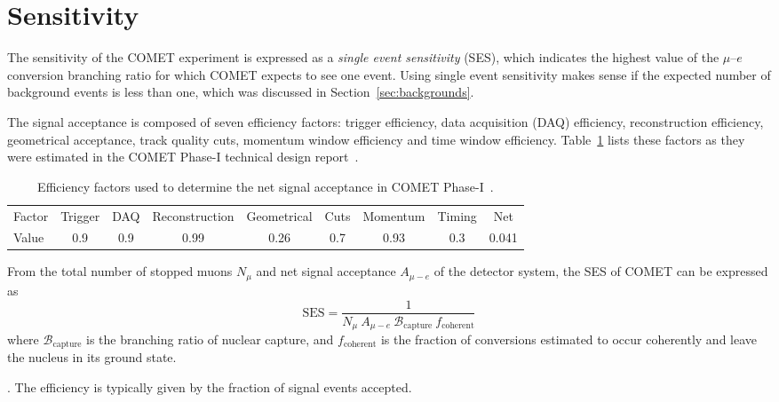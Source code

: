 
\section{Sensitivity}\label{sec:SES}

The sensitivity of the COMET experiment is expressed as a \emph{single event
sensitivity} (SES), which indicates the highest value of the $\mu$--$e$
conversion branching ratio for which COMET expects to see one event. Using
single event sensitivity makes sense if the expected number of background events
is less than one, which was discussed in Section~\ref{sec:backgrounds}.

The signal acceptance is composed of seven efficiency factors: trigger
efficiency, data acquisition (DAQ) efficiency, reconstruction efficiency, geometrical
acceptance, track quality cuts, momentum window efficiency and time window
efficiency. Table~\ref{tab:acceptance} lists these factors as they were
estimated in the COMET Phase-I technical design
report~\cite{the_comet_collaboration_comet_2020}.

\begin{table}
    \centering
    \begin{tabular}{l|ccccccc|c}
        \toprule
        Factor & Trigger & DAQ & Reconstruction & Geometrical & Cuts & Momentum
        & Timing & Net
        \\ 
        Value & 0.9 & 0.9 & 0.99 & 0.26 & 0.7 & 0.93 & 0.3 & 0.041 \\
        \bottomrule
    \end{tabular}
    \caption{ Efficiency factors used to determine the net signal acceptance in
    COMET Phase-I~\cite{the_comet_collaboration_comet_2020}.}
    \label{tab:acceptance} 
\end{table}

From the total number of stopped muons $N_\mu$ and net signal acceptance
$A_{\mu-e}$ of the detector system, the SES of COMET can be expressed as
\begin{equation}
    \mathrm{SES} = \frac{1}{N_\mu \  A_{\mu-e} \  
    \mathcal{B}_\mathrm{capture} \  f_\mathrm{coherent}}
\end{equation}
where $\mathcal{B}_\mathrm{capture}$ is the branching ratio of nuclear capture,
and $f_\mathrm{coherent}$ is the fraction of conversions estimated to occur
coherently and leave the nucleus in its ground state.

. The efficiency is typically given by the fraction of
signal events accepted. 


